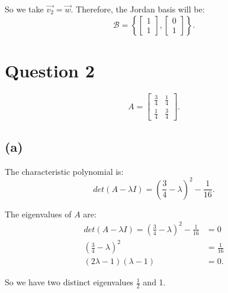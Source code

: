 \documentclass[10pt]{article}
\begin{document}
\noindent So we take $\Vec{v_2} = \Vec{w}$. Therefore, the Jordan basis will be:
\begin{equation*}
    \mathcal{B} = \left\{
    \begin{bmatrix}
        1 \\ 1
    \end{bmatrix},
    \begin{bmatrix}
        0 \\ 1
    \end{bmatrix}
    \right\}.
\end{equation*}



\section*{Question 2}
$$A = 
\begin{bmatrix}
    \frac{3}{4} & \frac{1}{4} \\
    \frac{1}{4} & \frac{3}{4}
\end{bmatrix}.$$

\subsection*{(a)}
\noindent The characteristic polynomial is:
\begin{equation*}
    det(A-\lambda I) = \left(\frac{3}{4} -\lambda \right)^2 - \frac{1}{16}.
\end{equation*}

\noindent The eigenvalues of $A$ are:
\begin{align*}
    det(A-\lambda I) = \left(\frac{3}{4} -\lambda \right)^2 - \frac{1}{16} &= 0 \\
    \left(\frac{3}{4} -\lambda \right)^2 &= \frac{1}{16} \\
    (2\lambda -1)(\lambda -1) &= 0.
\end{align*}

\noindent So we have two distinct eigenvalues $\frac{1}{2}$ and 1.
\end{document}
